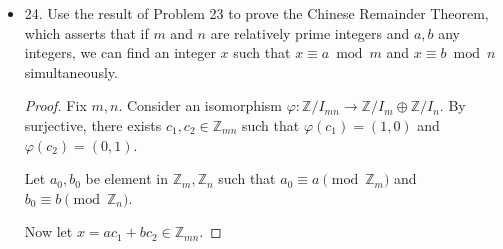 \begin{itemize}
\item 24. Use the result of Problem 23 to prove the Chinese Remainder Theorem, which asserts that if $m$ and $n$ are relatively prime integers and $a, b$ any integers, we can find an integer $x$ such that $x \equiv a \bmod m$ and $x \equiv b \bmod n$ simultaneously.
\begin{proof}
	Fix $m, n$. Consider an isomorphism $\varphi: \mathbb{Z} / I_{mn} \to  \mathbb{Z}/ I_m \oplus \mathbb{Z} / I_n$. By surjective, there exists $c_1, c_2 \in \mathbb{Z}_{mn}$ such that $\varphi(c_1) = (1,0)$ and $\varphi(c_2) = (0,1)$.

	Let $a_0, b_0$ be element in $\mathbb{Z}_m, \mathbb{Z}_n$ such that $a_0 \equiv a \pmod \mathbb{Z}_m$  and $b_0 \equiv b \pmod \mathbb{Z}_n$.

	Now let $x = ac_1 + b c_2 \in \mathbb{Z}_{mn}$. 
\end{proof}

\end{itemize}
